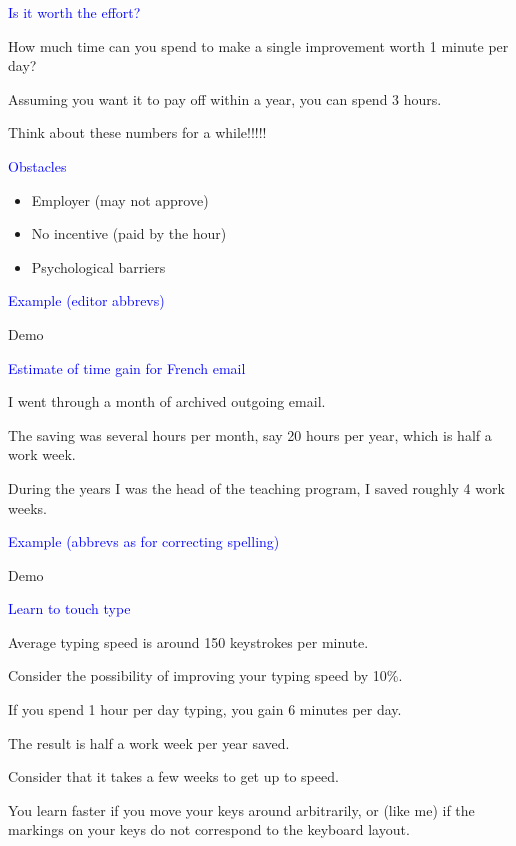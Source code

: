 \documentclass{slides}
\newcommand{\ti}[1]{\begin{center}\Large{\textcolor{blue}{#1}}\end{center}}
\begin{document}
\begin{slide}\ti{Is it worth the effort?}

How much time can you spend to make a single improvement worth 1
minute per day?

Assuming you want it to pay off within a year, you can spend 3 hours.

Think about these numbers for a while!!!!!

\vfill\end{slide}
\begin{slide}\ti{Obstacles}

  \begin{itemize}
  \item Employer (may not approve)
  \item No incentive (paid by the hour)
  \item Psychological barriers
  \end{itemize}

\vfill\end{slide}
\begin{slide}\ti{Example (editor abbrevs)}

Demo

\vfill\end{slide}
\begin{slide}\ti{Estimate of time gain for French email}

I went through a month of archived outgoing email.

The saving was several hours per month, say 20 hours per year, which
is half a work week.

During the years I was the head of the teaching program, I saved
roughly 4 work weeks.

\vfill\end{slide}
\begin{slide}\ti{Example (abbrevs as for correcting spelling)}

Demo

\vfill\end{slide}
\begin{slide}\ti{Learn to touch type}

Average typing speed is around 150 keystrokes per minute.

Consider the possibility of improving your typing speed by 10\%. 

If you spend 1 hour per day typing, you gain 6 minutes per day.

The result is half a work week per year saved.

Consider that it takes a few weeks to get up to speed.

You learn faster if you move your keys around arbitrarily, or (like
me) if the markings on your keys do not correspond to the keyboard
layout.

\vfill\end{slide}
\end{document}
